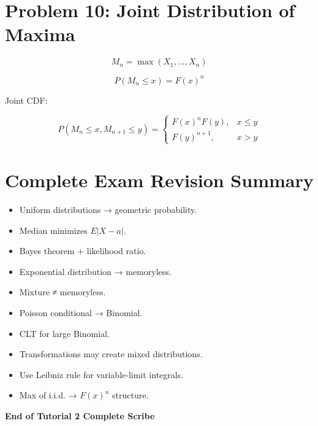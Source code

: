 \documentclass[11pt]{article}
\begin{document}
\section{Problem 10: Joint Distribution of Maxima}

\[
M_n=\max(X_1,\dots,X_n)
\]

\[
P(M_n \le x)=F(x)^n
\]

Joint CDF:

\[
P(M_n \le x, M_{n+1} \le y)
=
\begin{cases}
F(x)^n F(y), & x \le y \\
F(y)^{n+1}, & x > y
\end{cases}
\]

\section{Complete Exam Revision Summary}

\begin{itemize}

\item Uniform distributions → geometric probability.
\item Median minimizes $E|X-a|$.
\item Bayes theorem + likelihood ratio.
\item Exponential distribution → memoryless.
\item Mixture ≠ memoryless.
\item Poisson conditional → Binomial.
\item CLT for large Binomial.
\item Transformations may create mixed distributions.
\item Use Leibniz rule for variable-limit integrals.
\item Max of i.i.d. → $F(x)^n$ structure.

\end{itemize}

\bigskip
\centerline{\Large \textbf{End of Tutorial 2 Complete Scribe}}
\end{document}
